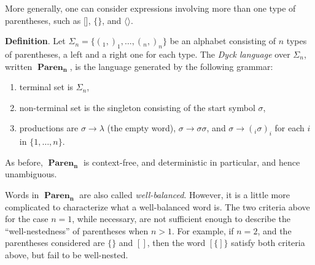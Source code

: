 \documentclass[12pt]{article}
\begin{document}
More generally, one can consider expressions involving more than one type of parentheses, such as [], $\lbrace \rbrace$, and $\langle \rangle$.

\textbf{Definition}.  Let $\Sigma_n = \lbrace (_1, )_1, \ldots, (_n, )_n \rbrace$ be an alphabet consisting of $n$ types of parentheses, a left and a right one for each type.  The \emph{Dyck language} over $\Sigma_n$, written  $\boldsymbol{\operatorname{Paren}_n}$, is the language generated by the following grammar:
\begin{enumerate}
\item terminal set is $\Sigma_n$, 
\item non-terminal set is the singleton consisting of the start symbol $\sigma$, 
\item productions are $\sigma \to \lambda$ (the empty word), $\sigma \to \sigma\sigma$, and $\sigma \to (_i \sigma )_i$ for each $i$ in $\lbrace 1,\ldots, n\rbrace$.  
\end{enumerate}
As before, $\boldsymbol{\operatorname{Paren}_n}$ is context-free, and deterministic in particular, and hence unambiguous.

Words in $\boldsymbol{\operatorname{Paren}_n}$ are also called \emph{well-balanced}.  However, it is a little more complicated to characterize what a well-balanced word is.  The two criteria above for the case $n=1$, while necessary, are not sufficient enough to describe the ``well-nestedness'' of parentheses when $n>1$.  For example, if $n=2$, and the parentheses considered are $\lbrace \rbrace$ and $[]$, then the word $[\lbrace ]\rbrace$ satisfy both criteria above, but fail to be well-nested.
\end{document}
